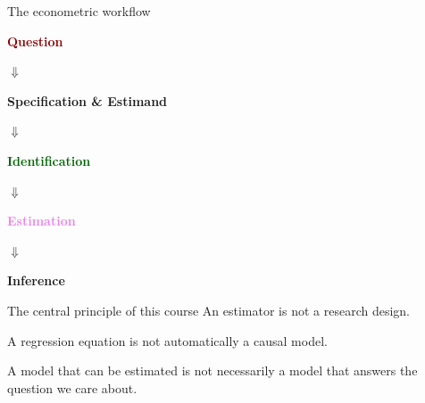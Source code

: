\documentclass[aspectratio=169,11pt]{beamer}
\newcommand{\Question}{\textcolor{DarkRed}{\textbf{Question}}}
\newcommand{\Spec}{\textcolor{DeepBlue}{\textbf{Specification \& Estimand}}}
\newcommand{\Ident}{\textcolor{DarkGreen}{\textbf{Identification}}}
\newcommand{\Est}{\textcolor{violet}{\textbf{Estimation}}}
\newcommand{\Infer}{\textcolor{orange!80!black}{\textbf{Inference}}}
\begin{document}
\begin{frame}{The econometric workflow}
\begin{center}
\large
\Question

\vspace{0.15em}
$\Downarrow$

\Spec

\vspace{0.15em}
$\Downarrow$

\Ident

\vspace{0.15em}
$\Downarrow$

\Est

\vspace{0.15em}
$\Downarrow$

\Infer
\end{center}

\vspace{0.2em}

\begin{block}{The central principle of this course}
An estimator is not a research design.

A regression equation is not automatically a causal model.

A model that can be estimated is not necessarily a model that answers
the question we care about.
\end{block}
\end{frame}
\end{document}
